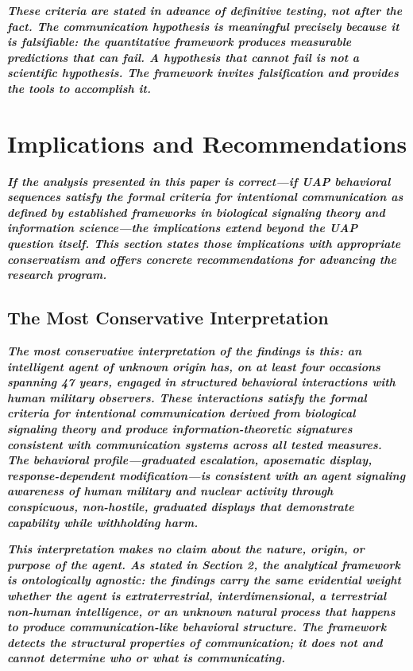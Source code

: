 \documentclass[11pt,letterpaper]{article}
\begin{document}
\textbf{\textit{These criteria are stated in advance of definitive testing, not after the fact. The communication hypothesis is meaningful precisely because it is falsifiable: the quantitative framework produces measurable predictions that can fail. A hypothesis that cannot fail is not a scientific hypothesis. The framework invites falsification and provides the tools to accomplish it.}}


\section{Implications and Recommendations}

\textbf{\textit{If the analysis presented in this paper is correct---if UAP behavioral sequences satisfy the formal criteria for intentional communication as defined by established frameworks in biological signaling theory and information science---the implications extend beyond the UAP question itself. This section states those implications with appropriate conservatism and offers concrete recommendations for advancing the research program.}}


\subsection{The Most Conservative Interpretation}

\textbf{\textit{The most conservative interpretation of the findings is this: an intelligent agent of unknown origin has, on at least four occasions spanning 47 years, engaged in structured behavioral interactions with human military observers. These interactions satisfy the formal criteria for intentional communication derived from biological signaling theory and produce information-theoretic signatures consistent with communication systems across all tested measures. The behavioral profile---graduated escalation, aposematic display, response-dependent modification---is consistent with an agent signaling awareness of human military and nuclear activity through conspicuous, non-hostile, graduated displays that demonstrate capability while withholding harm.}}


\textbf{\textit{This interpretation makes no claim about the nature, origin, or purpose of the agent. As stated in Section 2, the analytical framework is ontologically agnostic: the findings carry the same evidential weight whether the agent is extraterrestrial, interdimensional, a terrestrial non-human intelligence, or an unknown natural process that happens to produce communication-like behavioral structure. The framework detects the structural properties of communication; it does not and cannot determine who or what is communicating.}}
\end{document}
